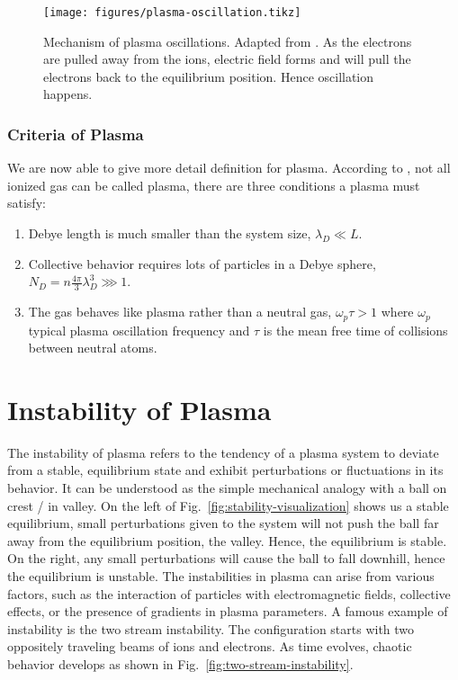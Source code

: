 \begin{figure}[htbp]
	\centering
	\texttt{[image: figures/plasma-oscillation.tikz]}
	\caption{Mechanism of plasma oscillations. Adapted from \cite{chen_introduction_2016}. As the electrons are pulled away from the ions, electric field forms and will pull the electrons back to the equilibrium position. Hence oscillation happens.}
	\label{fig:plasma-oscillation}
\end{figure}

\subsubsection*{Criteria of Plasma}
We are now able to give more detail definition for plasma. According to \cite{chen_introduction_2016}, not all ionized gas can be called plasma, there are three conditions a plasma must satisfy:
\begin{enumerate}
	\item Debye length is much smaller than the system size, $\lambda_D \ll L$.
	\item Collective behavior requires lots of particles in a Debye sphere, $N_D = n\frac{4\pi}{3}\lambda_D^3 \ggg 1$.
	\item The gas behaves like plasma rather than a neutral gas, $\omega_p\tau > 1$ where $\omega_p$ typical plasma oscillation frequency and $\tau$ is the mean free time of collisions between neutral atoms.
\end{enumerate}

\section{Instability of Plasma} \label{sec:instability-of-plasma-flow}
The instability of plasma refers to the tendency of a plasma system to deviate from a stable, equilibrium state and exhibit perturbations or fluctuations in its behavior. It can be understood as the simple mechanical analogy with a ball on crest / in valley. On the left of Fig.~\ref{fig:stability-visualization} shows us a stable equilibrium, small perturbations given to the system will not push the ball far away from the equilibrium position, the valley. Hence, the equilibrium is stable. On the right, any small perturbations will cause the ball to fall downhill, hence the equilibrium is unstable. The instabilities in plasma can arise from various factors, such as the interaction of particles with electromagnetic fields, collective effects, or the presence of gradients in plasma parameters. A famous example of instability is the two stream instability. The configuration starts with two oppositely traveling beams of ions and electrons. As time evolves, chaotic behavior develops as shown in Fig.~\ref{fig:two-stream-instability}.

